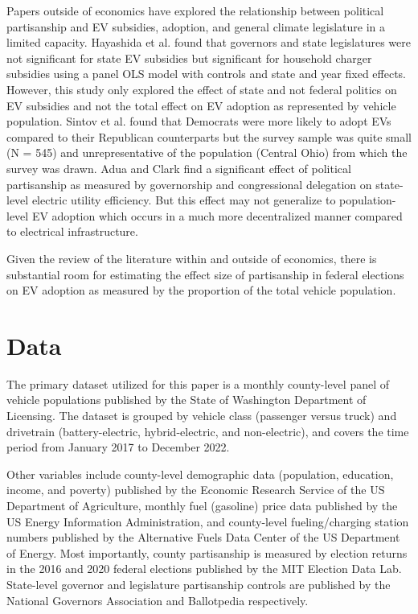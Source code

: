 \documentclass{article}
\begin{document}
Papers outside of economics have explored the relationship between political partisanship and EV subsidies, adoption, and general climate legislature in a limited capacity. Hayashida et al. found that governors and state legislatures were not significant for state EV subsidies but significant for household charger subsidies using a panel OLS model with controls and state and year fixed effects. \autocite{HAYASHIDA2021211} However, this study only explored the effect of state and not federal politics on EV subsidies and not the total effect on EV adoption as represented by vehicle population. Sintov et al. found that Democrats were more likely to adopt EVs compared to their Republican counterparts but the survey sample was quite small (N = 545) and unrepresentative of the population (Central Ohio) from which the survey was drawn. \autocite{SINTOV2020101576} Adua and Clark find a significant effect of political partisanship as measured by governorship and congressional delegation on state-level electric utility efficiency. \autocite{adua_clark_2020} But this effect may not generalize to population-level EV adoption which occurs in a much more decentralized manner compared to electrical infrastructure. 

Given the review of the literature within and outside of economics, there is substantial room for estimating the effect size of partisanship in federal elections on EV adoption as measured by the proportion of the total vehicle population. 

\section{Data}

The primary dataset utilized for this paper is a monthly county-level panel of vehicle populations published by the State of Washington Department of Licensing. The dataset is grouped by vehicle class (passenger versus truck) and drivetrain (battery-electric, hybrid-electric, and non-electric), and covers the time period from January 2017 to December 2022. 

Other variables include county-level demographic data (population, education, income, and poverty) published by the Economic Research Service of the US Department of Agriculture, monthly fuel (gasoline) price data published by the US Energy Information Administration, and county-level fueling/charging station numbers published by the Alternative Fuels Data Center of the US Department of Energy. Most importantly, county partisanship is measured by election returns in the 2016 and 2020 federal elections published by the MIT Election Data Lab. State-level governor and legislature partisanship controls are published by the National Governors Association and Ballotpedia respectively. 
\end{document}
